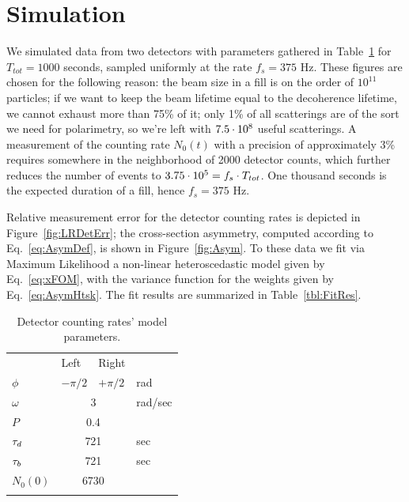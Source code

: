 \documentclass{jpconf}
\begin{document}
\section{Simulation}
We simulated data from two detectors with parameters gathered in Table~\ref{tbl:DetCntRtParam} for $T_{tot}=1000$ seconds, sampled uniformly at the rate $f_s = 375$ Hz. These figures are chosen for the following reason: the beam size in a fill is on the order of $10^{11}$ particles; if we want to keep the beam lifetime equal to the decoherence lifetime, we cannot exhaust more than 75\% of it; only 1\% of all scatterings are of the sort we need for polarimetry, so we're left with ${7.5}\cdot 10^{8}$ useful scatterings. A measurement of the counting rate $N_0(t)$ with a precision of approximately 3\% requires somewhere in the neighborhood of 2000 detector counts, which further reduces the number of events to ${3.75}\cdot 10^{5}= f_s\cdot T_{tot}$. One thousand seconds is the expected duration of a fill, hence $f_s = 375$ Hz. 

Relative measurement error for the detector counting rates is depicted in Figure~\ref{fig:LRDetErr}; the cross-section asymmetry, computed according to Eq.~\eqref{eq:AsymDef}, is shown in Figure~\ref{fig:Asym}.
To these data we fit via Maximum Likelihood a non-linear heteroscedastic model %
given by Eq.~\eqref{eq:xFOM}, with the variance function for the weights given by Eq.~\eqref{eq:AsymHtsk}. The fit results are summarized in Table~\ref{tbl:FitRes}.
\begin{table}[h]
	\caption{Detector counting rates' model parameters.\label{tbl:DetCntRtParam}}
	\centering
	\begin{tabular}{llll}
		\br
		&   Left   &     Right     &  \\ \mr
		$\phi$  & $-\pi/2$ &   $+\pi/2$    &   rad   \\
		$\omega$ &  \multicolumn{2}{c}{3}   & rad/sec \\
		$P$    & \multicolumn{2}{c}{0.4}  &  \\
		$\tau_d$  & \multicolumn{2}{c}{721}  &   sec   \\
		$\tau_b$  & \multicolumn{2}{c}{721}  &   sec   \\
		$N_0(0)$ & \multicolumn{2}{c}{6730} &  \\ \br
	\end{tabular}
\end{table}
\end{document}
